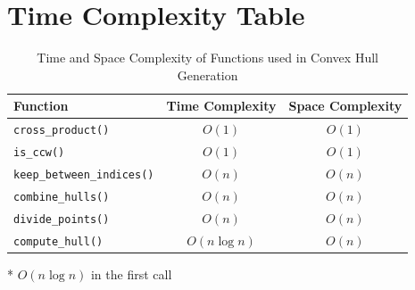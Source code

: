 \documentclass[12pt]{article}
\begin{document}
\section{Time Complexity Table}
\begin{table}[h]
    \centering
    \begin{threeparttable}
        \begin{tabular*}{\textwidth}{@{\extracolsep{\fill}}lcc@{}}
            \toprule
            \textbf{Function} & \textbf{Time Complexity} & \textbf{Space Complexity} \\ \midrule
            \texttt{cross\_product()} & $O(1)$ & $O(1)$ \\
            \texttt{is\_ccw()} & $O(1)$ & $O(1)$ \\
            \texttt{keep\_between\_indices()} & $O(n)$ & $O(n)$ \\
            \texttt{combine\_hulls()} & $O(n)$ & $O(n)$ \\
            \texttt{divide\_points()} & $O(n)$\tnote{*} & $O(n)$ \\ 
            \texttt{compute\_hull()} & $O(n \log n)$ & $O(n)$ \\ \bottomrule
        \end{tabular*}
        \begin{tablenotes}
            \item[*] $O(n \log n)$ in the first call
        \end{tablenotes}
        \caption{Time and Space Complexity of Functions used in Convex Hull Generation}
        \label{tab:complexity}
    \end{threeparttable}
\end{table}

\newpage %
\end{document}
